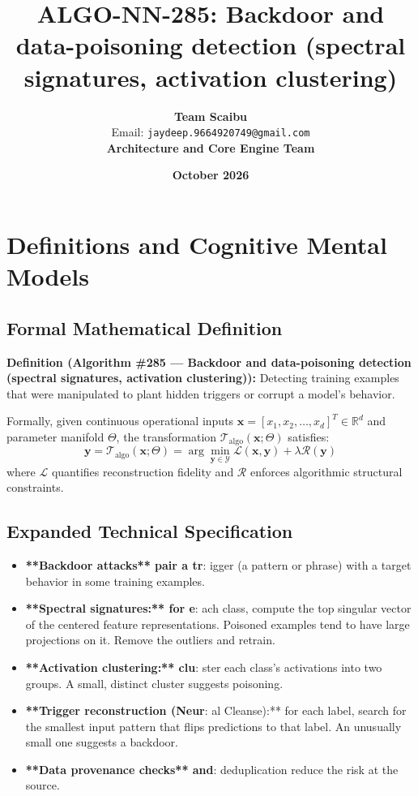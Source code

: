 \documentclass[11pt,a4paper]{article}
\title{\textbf{ALGO-NN-285: Backdoor and data-poisoning detection (spectral signatures, activation clustering)}}
\author{\textbf{Team Scaibu} \\ \small Email: \texttt{jaydeep.9664920749@gmail.com} \\ \small \textbf{Architecture and Core Engine Team}}
\date{\textbf{October 2026}}
\theoremstyle{definition}
\begin{document}
\maketitle

\section{Definitions and Cognitive Mental Models}

\subsection{Formal Mathematical Definition}
\textbf{Definition (Algorithm \#285 --- Backdoor and data-poisoning detection (spectral signatures, activation clustering)):}
Detecting training examples that were manipulated to plant hidden triggers or corrupt a model's behavior.

Formally, given continuous operational inputs $\mathbf{x} = [x_1, x_2, \dots, x_d]^T \in \mathbb{R}^d$ and parameter manifold $\Theta$, the transformation $\mathcal{T}_{\text{algo}}(\mathbf{x}; \Theta)$ satisfies:
{\boldmath
\begin{equation}
\mathbf{y} = \mathcal{T}_{\text{algo}}(\mathbf{x}; \Theta) = \arg\min_{\mathbf{y} \in \mathcal{Y}} \mathcal{L}(\mathbf{x}, \mathbf{y}) + \lambda \mathcal{R}(\mathbf{y})
\end{equation}
}
where $\mathcal{L}$ quantifies reconstruction fidelity and $\mathcal{R}$ enforces algorithmic structural constraints.

\subsection{Expanded Technical Specification}
\begin{itemize}
\item \textbf{**Backdoor attacks** pair a tr}: igger (a pattern or phrase) with a target behavior in some training examples.
\item \textbf{**Spectral signatures:** for e}: ach class, compute the top singular vector of the centered feature representations. Poisoned examples tend to have large projections on it. Remove the outliers and retrain.
\item \textbf{**Activation clustering:** clu}: ster each class's activations into two groups. A small, distinct cluster suggests poisoning.
\item \textbf{**Trigger reconstruction (Neur}: al Cleanse):** for each label, search for the smallest input pattern that flips predictions to that label. An unusually small one suggests a backdoor.
\item \textbf{**Data provenance checks** and}:  deduplication reduce the risk at the source.
\end{itemize}
\end{document}
